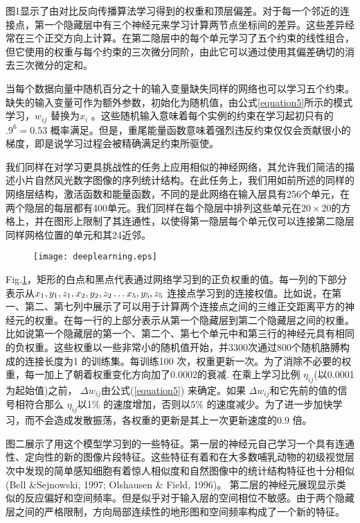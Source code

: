 \par{图1显示了由对比反向传播算法学习得到的权重和顶层偏差。对于每一个邻近的连接点，第一个隐藏层中有三个神经元来学习计算两节点坐标间的差异。这些差异经常在三个正交方向上计算。在第二隐层中的每个单元学习了五个约束的线性组合，但它使用的权重与每个约束的三次微分同阶，由此它可以通过使用其偏差确切的消去三次微分的定和。}
\par{当每个数据向量中随机百分之十的输入变量缺失同样的网络也可以学习五个约束。缺失的输入变量可作为额外参数，初始化为随机值，由公式\ref{equation5}所示的模式学习，${w_{ij}}$ 替换为${x_i}$ 。这些随机输入意味着每个实例的约束在学习起初只有的 ${.9^6} = 0.53$ 概率满足。但是，重尾能量函数意味着强烈违反约束仅仅会贡献很小的梯度，即是说学习过程会被精确满足约束所驱使。}
\par{我们同样在对学习更具挑战性的任务上应用相似的神经网络，其允许我们简洁的描述小片自然风光数字图像的序列统计结构。在此任务上，我们用如前所述的同样的网络层结构，激活函数和能量函数，不同的是此网络在输入层具有256个单元，在两个隐层的每层都有400单元。我们同样在每个隐层中排列这些单元在$20 \times 20 $的方格上，并在图形上限制了其连通性，以使得第一隐层每个单元仅可以连接第二隐层同样网格位置的单元和其24近邻。
\begin{figure}[htbp]
\centering
\texttt{[image: deeplearning.eps]}
\label{fig:deeplearning}
\vspace{\baselineskip} %
\end{figure}}
\par{
\footnotesize
 Fig.\ref{fig:deeplearning}，矩形的白点和黑点代表通过网络学习到的正负权重的值。每一列的下部分表示从${x_1},{\rm{ }}{y_1},{\rm{ }}{z_1},{\rm{ }}{x_2},{\rm{ }}{y_2},{\rm{ }}{z_2} \ldots {x_5},{\rm{ }}{y_5},{\rm{ }}{z_5}$ 连接点学习到的连接权值。比如说，在第一、第二、第七列中展示了可以用于计算两个连接点之间的三维正交距离平方的神经元的权重。在每一行的上部分表示从第一个隐藏层到第二个隐藏层之间的权重。比如说第一个隐藏层的第一个、第二个、第七个单元中和第三行的神经元具有相同的负权重。这些权重以一些非常小的随机值开始，并3300次通过800个随机胳膊构成的连接长度为1 的训练集。每训练100 次，权重更新一次。为了消除不必要的权重，每一加上了朝着权重变化方向加了0.0002的衰减. 在乘上学习比例 ${\eta _{ij}}$(以0.0001为起始值)之前， $\Delta {w_{ij}}$由公式(\ref{equation5}) 来确定。如果 $\Delta {w_{ij}}$和它先前的值的信号相符合那么 ${\eta _{ij}}$以1\% 的速度增加，否则以5\% 的速度减少。为了进一步加快学习，而不会造成发散振荡，各权重的更新是其上一次更新速度的0.9 倍。}

\par{图二展示了用这个模型学习到的一些特征。第一层的神经元自己学习一个具有连通性、定向性的新的图像片段特征。这些特征有着和在大多数哺乳动物的初级视觉层次中发现的简单感知细胞有着惊人相似度和自然图像中的统计结构特征也十分相似(Bell \&Sejnowski, 1997; Olshausen \& Field, 1996)。 第二层的神经元展现显示类似的反应偏好和空间频率。但是似乎对于输入层的空间相位不敏感。由于两个隐藏层之间的严格限制，方向局部连续性的地形图和空间频率构成了一个新的特征。}



